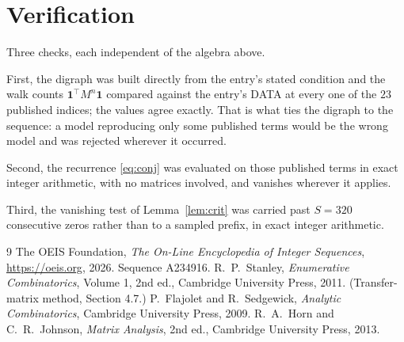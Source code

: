 \documentclass[11pt,a4paper]{article}
\theoremstyle{plain}
\theoremstyle{definition}
\begin{document}
\section{Verification}

Three checks, each independent of the algebra above.

First, the digraph was built directly from the entry's stated condition and the walk counts
$\mathbf{1}^{\!\top}M^{n}\mathbf{1}$ compared against the entry's DATA at every one of
the $23$ published indices; the values agree exactly. That is what ties the digraph to
the sequence: a model reproducing only some published terms would be the wrong model and
was rejected wherever it occurred.

Second, the recurrence \eqref{eq:conj} was evaluated on those published terms in exact
integer arithmetic, with no matrices involved, and vanishes wherever it applies.

Third, the vanishing test of Lemma~\ref{lem:crit} was carried past $S=320$ consecutive
zeros rather than to a sampled prefix, in exact integer arithmetic.

\begin{thebibliography}{9}
 The OEIS Foundation, \emph{The On-Line Encyclopedia of Integer
Sequences}, \url{https://oeis.org}, 2026. Sequence A234916.
 R.~P.~Stanley, \emph{Enumerative Combinatorics}, Volume 1, 2nd ed.,
Cambridge University Press, 2011. (Transfer-matrix method, Section 4.7.)
 P.~Flajolet and R.~Sedgewick, \emph{Analytic Combinatorics}, Cambridge
University Press, 2009.
 R.~A.~Horn and C.~R.~Johnson, \emph{Matrix Analysis}, 2nd ed., Cambridge
University Press, 2013.
\end{thebibliography}
\end{document}
